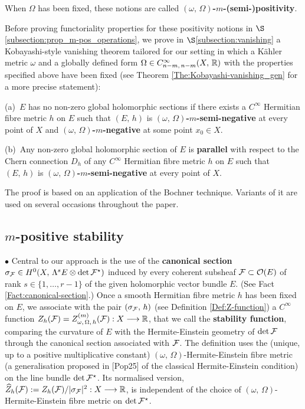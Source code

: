 \documentclass[12pt]{article}
\begin{document}
  When $\Omega$ has been fixed, these notions are called {\bf $(\omega,\,\Omega)$-$m$-(semi-)positivity}.

  Before proving functoriality properties for these positivity notions in $\S$\ref{subsection:prop_m-pos_operations}, we prove in $\S$\ref{subsection:vanishing} a Kobayashi-style vanishing theorem tailored for our setting in which a K\"ahler metric $\omega$ and a globally defined form $\Omega\in C^\infty_{n-m,\,n-m}(X,\,\mathbb{R})$ with the properties specified above have been fixed (see Theorem \ref{The:Kobayashi-vanishing_gen} for a more precise statement):

  \begin{The}\label{The:introd_Kobayashi-vanishing_gen} (a)\, $E$ has no non-zero global holomorphic sections if there exists a $C^\infty$ Hermitian fibre metric $h$ on $E$ such that $(E,\,h)$ is {\bf $(\omega,\,\Omega)$-$m$-semi-negative} at every point of $X$ and {\bf $(\omega,\,\Omega)$-$m$-negative} at some point $x_0\in X$.

\vspace{1ex}

(b)\, Any non-zero global holomorphic section of $E$ is {\bf parallel} with respect to the Chern connection $D_h$ of any $C^\infty$ Hermitian fibre metric $h$ on $E$ such that $(E,\,h)$ is {\bf $(\omega,\,\Omega)$-$m$-semi-negative} at every point of $X$.   


\end{The}    

  The proof is based on an application of the Bochner technique. Variants of it are used on several occasions throughout the paper.


  \subsection{$m$-positive stability}\label{subsection:introd_m-positive-stability}

  $\bullet$ Central to our approach is the use of the {\bf canonical section} $\sigma_{{\cal F}}\in H^0(X,\,\Lambda^s E\otimes\det{\cal F}^\star)$ induced by every coherent subsheaf ${\cal F}\subset{\cal O}(E)$ of rank $s\in\{1,\dots , r-1\}$ of the given holomorphic vector bundle $E$. (See Fact \ref{Fact:canonical-section}.) Once a smooth Hermitian fibre metric $h$ has been fixed on $E$, we associate with the pair $(\sigma_{{\cal F}},\,h)$ (see Definition \ref{Def:Z-function}) a $C^\infty$ function $Z_h({\cal F})= Z_{\omega,\,\Omega,\,h}^{(m)}({\cal F}):X\longrightarrow\mathbb{R}$, that we call the {\bf stability function}, comparing the curvature of $E$ with the Hermite-Einstein geometry of $\det{\cal F}$ through the canonical section associated with ${\cal F}$. The definition uses the (unique, up to a positive multiplicative constant) $(\omega,\,\Omega)$-Hermite-Einstein fibre metric (a generalisation proposed in [Pop25] of the classical Hermite-Einstein condition) on the line bundle $\det{\cal F}^\star$. Its normalised version, $\widehat{Z}_h({\cal F}):=Z_h({\cal F})/|\sigma_{{\cal F}}|^2:X\longrightarrow\mathbb{R}$, is independent of the choice of $(\omega,\,\Omega)$-Hermite-Einstein fibre metric on $\det{\cal F}^\star$.
\end{document}
